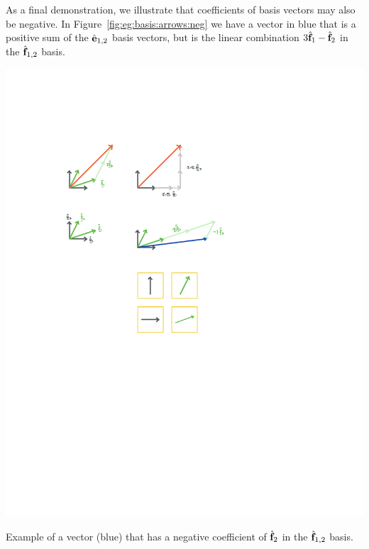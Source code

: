 As a final demonstration, we illustrate that coefficients of basis vectors may also be negative. In Figure~\ref{fig:eg:basis:arrows:neg} we have a vector in blue that is a positive sum of the $\hat{\mathbf{e}}_{1,2}$ basis vectors, but is the linear combination $3\hat{\mathbf{f}}_1 - \hat{\mathbf{f}}_2$ in the $\hat{\mathbf{f}}_{1,2}$ basis.
\begin{marginfigure}%
    \includegraphics[width=\textwidth]{figures/basis_neg.pdf}
    \caption{Example of a vector (blue) that has a negative coefficient of $\hat{\mathbf{f}}_2$ in the $\hat{\mathbf{f}}_{1,2}$ basis.}
    \label{fig:eg:basis:arrows:neg}
\end{marginfigure}

